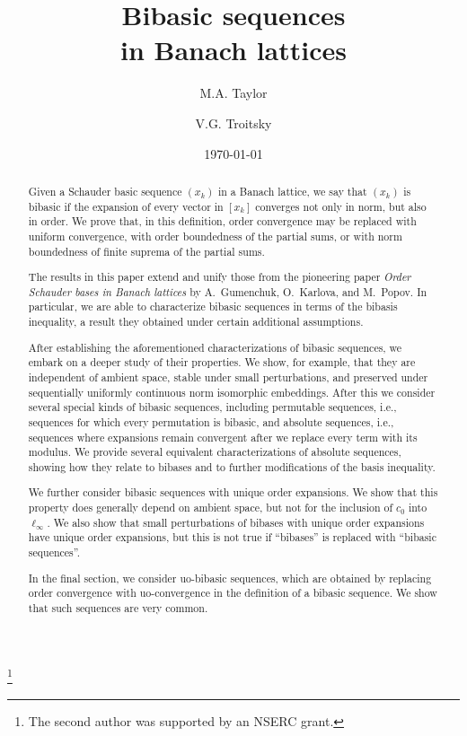 \documentclass[12pt]{amsart}
\theoremstyle{plain}
\theoremstyle{definition}
\begin{document}
\title[Bibasic sequences]
{Bibasic sequences\\ in Banach lattices}

\author{M.A. Taylor}
\author{V.G. Troitsky}
\address{Department of Mathematics, University of California,
  Berkeley, CA, 94720, United States.}
\address{Department of Mathematical and Statistical Sciences,
         University of Alberta, Edmonton, AB, T6G\,2G1, Canada.}


\thanks{The second author was supported by an NSERC grant.}

\date{\today}

\begin{abstract}
  Given a Schauder basic sequence $(x_k)$ in a Banach lattice, we say
  that $(x_k)$ is bibasic if the expansion of every vector in $[x_k]$
  converges not only in norm, but also in order. We prove that, in this
  definition, order convergence may be replaced with uniform
  convergence, with order boundedness of the partial sums, or with
  norm boundedness of finite suprema of the partial sums.

  The results in this paper extend and unify those from the pioneering
  paper \emph{Order Schauder bases in Banach lattices} by A.~Gumenchuk,
  O.~Karlova, and M.~Popov. In particular, we are able to characterize
  bibasic sequences in terms of the bibasis inequality, a result they
  obtained under certain additional assumptions.

  After establishing the aforementioned characterizations of bibasic
  sequences, we embark on a deeper study of their properties. We show,
  for example, that they are independent of ambient space, stable
  under small perturbations, and preserved under sequentially
  uniformly continuous norm isomorphic embeddings. After this we
  consider several special kinds of bibasic sequences, including
  permutable sequences, i.e., sequences for which every permutation
  is bibasic, and absolute sequences, i.e., sequences where
  expansions remain convergent after we replace every term with its
  modulus. We provide several equivalent characterizations of absolute
  sequences, showing how they relate to bibases and to further
  modifications of the basis inequality.

  We further consider bibasic sequences with unique order
  expansions. We show that this property does generally depend on
  ambient space, but not for the inclusion of $c_0$
  into~$\ell_\infty$. We also show that small perturbations of bibases
  with unique order expansions have unique order expansions, but this
  is not true if ``bibases'' is replaced with ``bibasic sequences''.

  In the final section, we consider uo-bibasic sequences, which are
  obtained by replacing order convergence with uo-convergence  in the
  definition of a bibasic sequence. We show that such sequences are
  very common.
\end{abstract}
\end{document}
